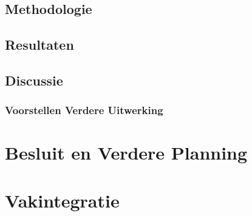\documentclass[a4paper,11pt]{article}
\begin{document}
	\subsection{Methodologie}
	\subsection{Resultaten}
	\subsection{Discussie}
	\subsubsection{Voorstellen Verdere Uitwerking}
	
	
	
	\section{Besluit en Verdere Planning}
	
	
	
	\section{Vakintegratie}	%
	
	
	
	
	
	
	
	\begin{thebibliography}{10}	%
		
	\end{thebibliography}
	\listoffigures		%
	\listoftables		%
\end{document}
